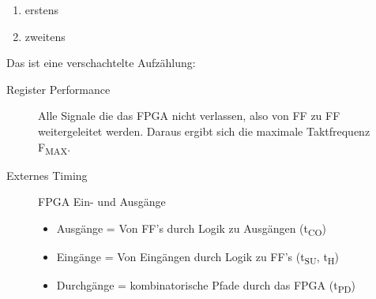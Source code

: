 \begin{enumerate}
\item erstens
\item zweitens
\end{enumerate}



Das ist eine verschachtelte Aufzählung:
\begin{description}
		\item [Register Performance] Alle Signale die das FPGA nicht verlassen, also von FF zu FF weitergeleitet werden. Daraus ergibt sich die maximale Taktfrequenz F\textsubscript{MAX}.

		\item [Externes Timing] FPGA Ein- und Ausgänge
		\begin{itemize}
			\item Ausgänge = Von FF's durch Logik zu Ausgängen (t\textsubscript{CO})
			\item Eingänge = Von Eingängen durch Logik zu FF's (t\textsubscript{SU}, t\textsubscript{H})
			\item Durchgänge = kombinatorische Pfade durch das FPGA (t\textsubscript{PD})
		\end{itemize}
\end{description}

